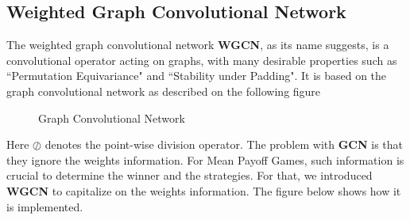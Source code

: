 \subsection{Weighted Graph Convolutional Network}
The weighted graph convolutional network \textbf{WGCN}, as its name suggests, is a convolutional operator acting on graphs, with many desirable properties such as ``Permutation Equivariance" and ``Stability under Padding".
\newline It is based on the graph convolutional network as described on the following figure
\begin{figure}[H]
	\noindent
	
	\caption{Graph Convolutional Network}
	\label{fig:GCN}
\end{figure}
\FloatBarrier
Here $\oslash$ denotes the point-wise division operator.
\newline 
The problem with \textbf{GCN} is that they ignore the weights information. For Mean Payoff Games, such information is crucial to determine the winner and the strategies.
\newline For that, we introduced \textbf{WGCN} to capitalize on the weights information. The figure below shows how it is implemented.

